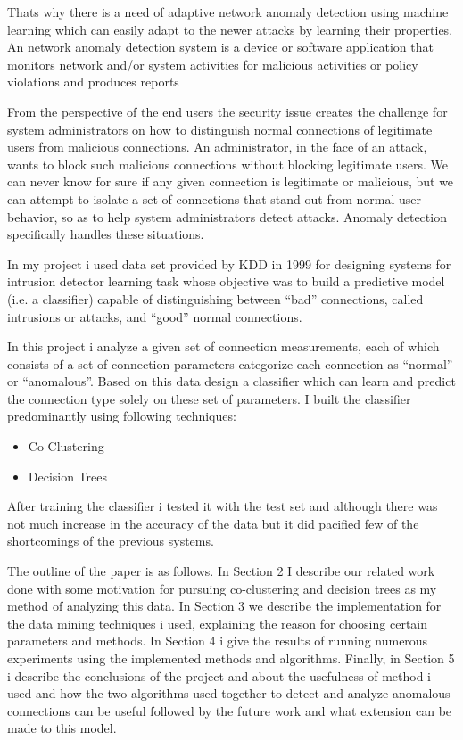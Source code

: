 \documentclass{acm_proc_article-sp}
\begin{document}
Thats why there is a need of adaptive network anomaly detection using machine learning which can easily adapt to the newer attacks by learning their properties. An network anomaly detection system is a device or software application that monitors network and/or system activities for malicious activities or policy violations and produces reports\cite{kdm}

From the perspective of the end users the security issue creates the challenge for system administrators on how to distinguish normal connections of legitimate users from malicious connections. An administrator, in the face of an attack, wants to block such malicious connections without blocking legitimate users. We can never know for sure if any given connection is legitimate or malicious, but we can attempt to isolate a set of connections that stand out from normal user behavior, so as to help system administrators detect attacks. Anomaly detection specifically handles these situations.

In my project i used data set provided by KDD in 1999 for designing systems for intrusion detector learning task whose objective was to build a predictive model (i.e. a classifier) capable of distinguishing between ``bad'' connections, called intrusions or attacks, and ``good'' normal connections.\cite{kdd}

In this project i analyze a given set of connection measurements, each of which consists of a set of connection parameters categorize each connection as ``normal'' or ``anomalous''. Based on this data design a classifier which can learn and predict the connection type solely on these set of parameters. I built the classifier predominantly using following techniques:
\begin{itemize}
\item Co-Clustering
\item Decision Trees
\end{itemize}

After training the classifier i tested it with the test set and although there was not much increase in the accuracy of the data but it did pacified few of the shortcomings of the previous systems.

The outline of the paper is as follows. In Section 2 I describe our related work done with some motivation for pursuing co-clustering and decision trees as my method of analyzing this data. In Section 3 we describe the implementation for the data mining techniques i used, explaining the reason for choosing certain parameters and methods. In Section 4 i give the results of running numerous experiments using the implemented methods and algorithms. Finally, in Section 5 i describe the conclusions of the project and about the usefulness of method i used and how the two algorithms used together to detect and analyze anomalous connections can be useful followed by the future work and what extension can be made to this model.
\end{document}

